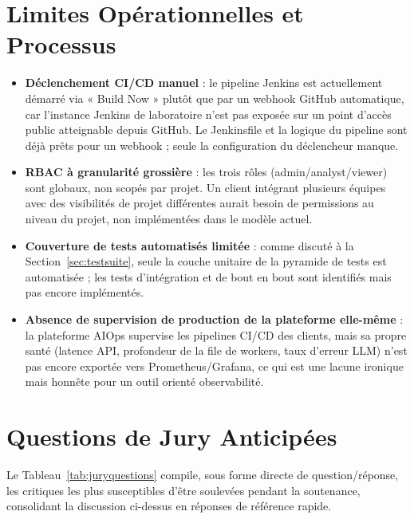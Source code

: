 \documentclass[12pt,a4paper,oneside]{report}
\begin{document}
\section{Limites Opérationnelles et Processus}
\begin{itemize}
\item \textbf{Déclenchement CI/CD manuel} : le pipeline Jenkins est actuellement démarré via « Build Now » plutôt que par un webhook GitHub automatique, car l'instance Jenkins de laboratoire n'est pas exposée sur un point d'accès public atteignable depuis GitHub. Le Jenkinsfile et la logique du pipeline sont déjà prêts pour un webhook ; seule la configuration du déclencheur manque.
\item \textbf{RBAC à granularité grossière} : les trois rôles (admin/analyst/viewer) sont globaux, non scopés par projet. Un client intégrant plusieurs équipes avec des visibilités de projet différentes aurait besoin de permissions au niveau du projet, non implémentées dans le modèle actuel.
\item \textbf{Couverture de tests automatisés limitée} : comme discuté à la Section~\ref{sec:testsuite}, seule la couche unitaire de la pyramide de tests est automatisée ; les tests d'intégration et de bout en bout sont identifiés mais pas encore implémentés.
\item \textbf{Absence de supervision de production de la plateforme elle-même} : la plateforme AIOps supervise les pipelines CI/CD des clients, mais sa propre santé (latence API, profondeur de la file de workers, taux d'erreur LLM) n'est pas encore exportée vers Prometheus/Grafana, ce qui est une lacune ironique mais honnête pour un outil orienté observabilité.
\end{itemize}

\section{Questions de Jury Anticipées}
Le Tableau~\ref{tab:juryquestions} compile, sous forme directe de question/réponse, les critiques les plus susceptibles d'être soulevées pendant la soutenance, consolidant la discussion ci-dessus en réponses de référence rapide.
\end{document}
